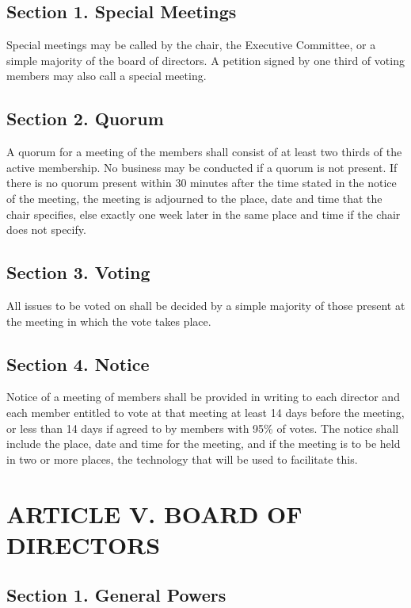 \documentclass[a4paper]{article}
\begin{document}
\subsection*{Section 1. Special Meetings}

Special meetings may be called by the chair, the Executive Committee, or a simple majority of the board of directors. A petition signed by one third of voting members may also call a special meeting.

\subsection*{Section 2. Quorum}

A quorum for a meeting of the members shall consist of at least two thirds of the active membership. No business may be conducted if a quorum is not present. If there is no quorum present within 30 minutes after the time stated in the notice of the meeting, the meeting is adjourned to the place, date and time that the chair specifies, else exactly one week later in the same place and time if the chair does not specify.

\subsection*{Section 3.  Voting}

All issues to be voted on shall be decided by a simple majority of those present at the meeting in which the vote takes place.

\subsection*{Section 4. Notice}

Notice of a meeting of members shall be provided in writing to each director and each member entitled to vote at that meeting at least 14 days before the meeting, or less than 14 days if agreed to by members with 95\% of votes. The notice shall include the place, date and time for the meeting, and if the meeting is to be held in two or more places, the technology that will be used to facilitate this.

\section*{ARTICLE V. BOARD OF DIRECTORS}


\subsection*{Section 1. General Powers}
\end{document}
